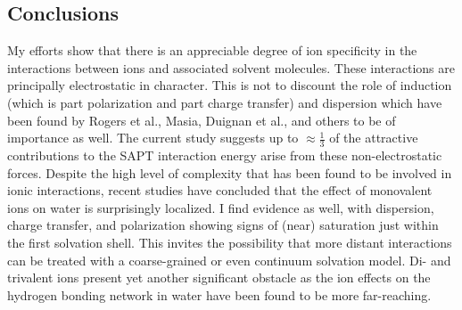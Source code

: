 \begin{sie}
  \section{\label{ch3:sec3:level1}Conclusions}
  My efforts show that there is an appreciable degree of ion specificity in the interactions between ions and associated solvent molecules. 
  These interactions are principally electrostatic in character. This is not to discount the role of induction (which is part polarization and
  part charge transfer) and dispersion which have been found by Rogers et al.\cite{rogers2010ctpolar,rogers2010qct}, Masia\cite{masia2013polar}, 
  Duignan et al.\cite{ninham2011review,duignan2013continuum1,duignan2013continuum2,duignan2014ion,duignan2014collins}, and 
  others\cite{collins2007review,soniat2012ct,soniat2014ct_surf,yao2014ct_diffusion,soniat2015znmg,soniat2015proton} to be of importance as well. The
  current study suggests up to $\approx\frac{1}{3}$ of the attractive contributions to the SAPT interaction energy arise from these 
  non-electrostatic forces. Despite the high level of complexity that has been found to be involved in ionic interactions, recent studies have 
  concluded that the effect of monovalent ions on water is surprisingly localized\cite{beck2011local,williams2012nanodrops}. I find evidence as
  well, with dispersion, charge transfer, and polarization showing signs of (near) saturation just within the first solvation shell. This invites 
  the possibility that more distant interactions can be treated with a coarse-grained or even continuum solvation model. Di- and trivalent ions 
  present yet another significant obstacle as the ion effects on the hydrogen bonding network in water have been found to be more
  far-reaching\cite{williams2012nanodrops,williams2015trivalent,williams2015crystal}.
  

\end{sie}
